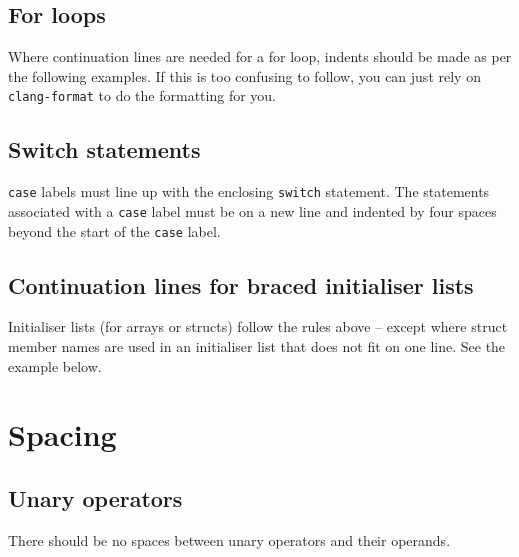 \documentclass{article}
\begin{document}
\nolinenumbers
{}

\linenumbers

\subsection{For loops} 
Where continuation lines are needed for a for loop, indents should be made as per the following examples. If this is too
confusing to follow, you can just rely on \texttt{clang-format} to do the formatting for you. 

\nolinenumbers
{}

\linenumbers

\subsection{Switch statements}
\texttt{case} labels must line up with the enclosing \texttt{switch} statement. The statements associated with a \texttt{case}
label must be on a new line and indented by four spaces beyond the start of the \texttt{case} label.



\linenumbers

\subsection{Continuation lines for braced initialiser lists}
Initialiser lists (for arrays or structs) follow the rules above -- except where struct member names are used in an initialiser list that does not fit on one line. See the example below.

\nolinenumbers
{}

\linenumbers

\section{Spacing}

\subsection{Unary operators}
There should be no spaces between unary operators and their operands.

\nolinenumbers
{}

\linenumbers
\end{document}
